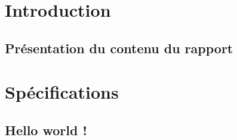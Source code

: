 





\newpage
\tableofcontents
{%
\let\oldnumberline\numberline%
\renewcommand{\numberline}{\figurename~\oldnumberline}%
\renewcommand\listfigurename{Liste des figures}
\listoffigures%
}
{%
\let\oldnumberline\numberline%
\renewcommand{\numberline}{\tablename~\oldnumberline}%
\renewcommand\listtablename{Liste des tableaux}
\listoftables%
}

\newpage
{}
\chapter*{Introduction}
\section*{Présentation du contenu du rapport}

\newpage
{}
\chapter{Spécifications}
\section{Hello world !}



